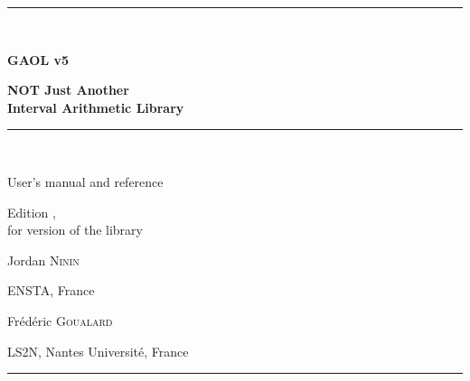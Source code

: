 \documentclass[12pt,a4paper,twoside,openright]{book}
\begin{document}
\frontmatter
\pagestyle{plain}

\begin{titlepage}
\thispagestyle{vide}
\null\vspace{1cm}
\begin{center}
\rule{\textwidth}{1pt}\\[1.4cm]
{\fontsize{40pt}{44pt}\selectfont\bfseries GAOL v5\par}
\vspace{0.8cm}
{\LARGE\bfseries NOT Just Another\\[0.2cm] Interval Arithmetic Library\par}
\vspace{1.4cm}
\rule{\textwidth}{1pt}\\[1.6cm]
{\Large User's manual and reference\par}
\vspace{0.6cm}
{\large Edition \edition, \updated\\[0.2cm]
for version \version{} of the library\par}
\vfill
{\Large Jordan \textsc{Ninin}\par}
\vspace{0.2cm}
{\large ENSTA, France\par}
\vspace{0.9cm}
{\Large Fr\'ed\'eric \textsc{Goualard}\par}
\vspace{0.2cm}
{\large LS2N, Nantes Universit\'e, France\par}
\vspace{1.4cm}
\rule{\textwidth}{1pt}
\end{center}
\end{titlepage}
\end{document}
